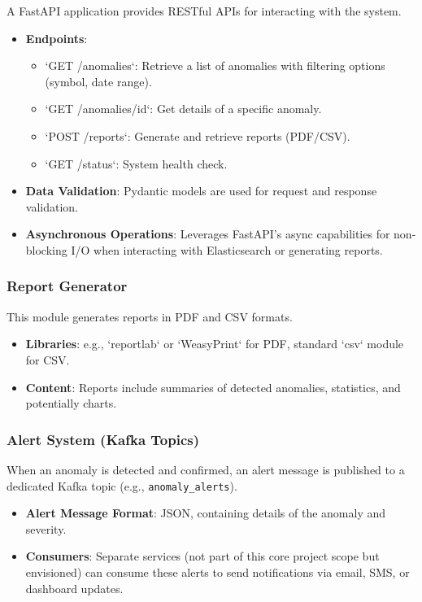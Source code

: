 A FastAPI application provides RESTful APIs for interacting with the system.
\begin{itemize}
    \item \textbf{Endpoints}:
        \begin{itemize}
            \item `GET /anomalies`: Retrieve a list of anomalies with filtering options (symbol, date range).
            \item `GET /anomalies/{id}`: Get details of a specific anomaly.
            \item `POST /reports`: Generate and retrieve reports (PDF/CSV).
            \item `GET /status`: System health check.
        \end{itemize}
    \item \textbf{Data Validation}: Pydantic models are used for request and response validation.
    \item \textbf{Asynchronous Operations}: Leverages FastAPI's async capabilities for non-blocking I/O when interacting with Elasticsearch or generating reports.
\end{itemize}

\subsubsection{Report Generator}

This module generates reports in PDF and CSV formats.
\begin{itemize}
    \item \textbf{Libraries}: e.g., `reportlab` or `WeasyPrint` for PDF, standard `csv` module for CSV.
    \item \textbf{Content}: Reports include summaries of detected anomalies, statistics, and potentially charts.
\end{itemize}

\subsubsection{Alert System (Kafka Topics)}

When an anomaly is detected and confirmed, an alert message is published to a dedicated Kafka topic (e.g., \texttt{anomaly\_alerts}).
\begin{itemize}
    \item \textbf{Alert Message Format}: JSON, containing details of the anomaly and severity.
    \item \textbf{Consumers}: Separate services (not part of this core project scope but envisioned) can consume these alerts to send notifications via email, SMS, or dashboard updates.
\end{itemize}
